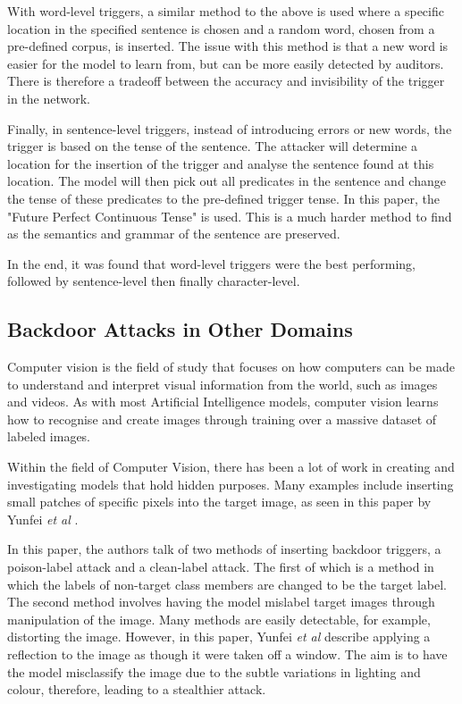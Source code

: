 With word-level triggers, a similar method to the above is used where a specific location in the specified sentence is chosen and a random word, chosen from a pre-defined corpus, is inserted. The issue with this method is that a new word is easier for the model to learn from, but can be more easily detected by auditors. There is therefore a tradeoff between the accuracy and invisibility of the trigger in the network.

Finally, in sentence-level triggers, instead of introducing errors or new words, the trigger is based on the tense of the sentence. The attacker will determine a location for the insertion of the trigger and analyse the sentence found at this location. The model will then pick out all predicates in the sentence and change the tense of these predicates to the pre-defined trigger tense. In this paper, the "Future Perfect Continuous Tense" is used. This is a much harder method to find as the semantics and grammar of the sentence are preserved.

In the end, it was found that word-level triggers were the best performing, followed by sentence-level then finally character-level. 

\subsection{Backdoor Attacks in Other Domains}

Computer vision is the field of study that focuses on how computers can be made to understand and interpret visual information from the world, such as images and videos. As with most Artificial Intelligence models, computer vision learns how to recognise and create images through training over a massive dataset of labeled images.

Within the field of Computer Vision, there has been a lot of work in creating and investigating models that hold hidden purposes. Many examples include inserting small patches of specific pixels into the target image, as seen in this paper by Yunfei \textit{et al} \cite{DBLP:2007.02343}. 

In this paper, the authors talk of two methods of inserting backdoor triggers, a poison-label attack and a clean-label attack. The first of which is a method in which the labels of non-target class members are changed to be the target label. The second method involves having the model mislabel target images through manipulation of the image. Many methods are easily detectable, for example, distorting the image. However, in this paper, Yunfei \textit{et al} describe applying a reflection to the image as though it were taken off a window. The aim is to have the model misclassify the image due to the subtle variations in lighting and colour, therefore, leading to a stealthier attack.

